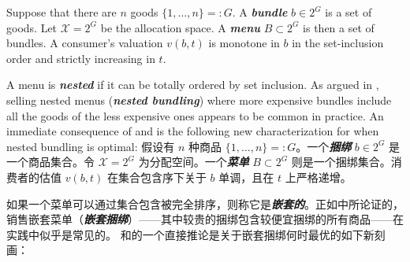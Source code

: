 \documentclass[12pt,letterpaper]{article}
\newenvironment{original}{\color{black}\noindent}{}
\newenvironment{translation}{\color{blue}\noindent}{}
\theoremstyle{plain}
\theoremstyle{definition}
\theoremstyle{remark}
\renewcommand{\1}{\mathds{1}}
\theoremstyle{definition}
\begin{document}
\begin{original}
Suppose that there are $n$ goods $\{1, \dots, n\} =: G$. A \textit{\textbf{bundle}} $b \in 2^{G}$ is a set of goods. Let $\mathcal{X} = 2^{G}$ be the allocation space. A  \textit{\textbf{menu}} $B \subset 2^{G}$ is then a set of bundles. A consumer's valuation $v(b, t)$ is monotone in $b$ in the set-inclusion order and strictly increasing in $t$.

A menu is \textit{\textbf{nested}} if it can be totally ordered by set inclusion. As argued in \citet{yang2023nested}, selling nested menus (\textit{\textbf{nested bundling}}) where more expensive bundles include all the goods of the less expensive ones appears to be common in practice.
An immediate consequence of  and  is the following new characterization for when nested bundling is optimal:
\end{original}
\begin{translation}
假设有 $n$ 种商品 $\{1, \dots, n\} =: G$。一个\textit{\textbf{捆绑}} $b \in 2^{G}$ 是一个商品集合。令 $\mathcal{X} = 2^{G}$ 为分配空间。一个\textit{\textbf{菜单}} $B \subset 2^{G}$ 则是一个捆绑集合。消费者的估值 $v(b, t)$ 在集合包含序下关于 $b$ 单调，且在 $t$ 上严格递增。

如果一个菜单可以通过集合包含被完全排序，则称它是\textit{\textbf{嵌套的}}。正如\citet{yang2023nested}中所论证的，销售嵌套菜单（\textit{\textbf{嵌套捆绑}}）——其中较贵的捆绑包含较便宜捆绑的所有商品——在实践中似乎是常见的。
和的一个直接推论是关于嵌套捆绑何时最优的如下新刻画：
\end{translation}
\end{document}
